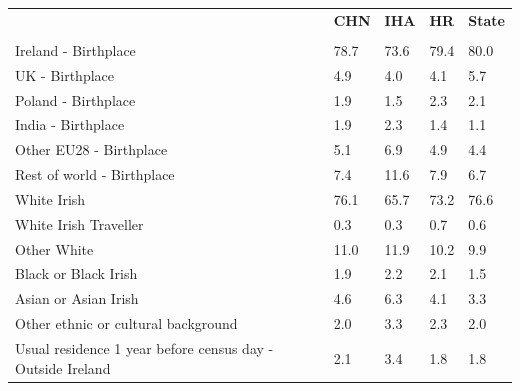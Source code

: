 \documentclass{article}
\begin{document}
\pagebreak
\begin{table}[h]	
\centering
		\begin{tabular}{KTTTT}
  \hline
& \textbf{CHN} & \textbf{IHA} & \textbf{HR}& \textbf{State}\\ 
  \hline
    \\ 
    \hline
Ireland - Birthplace & 78.7& 73.6& 79.4& 80.0\\
UK - Birthplace & 4.9& 4.0& 4.1& 5.7\\
Poland - Birthplace & 1.9& 1.5& 2.3& 2.1\\
India - Birthplace & 1.9& 2.3& 1.4& 1.1\\
Other EU28 - Birthplace & 5.1& 6.9& 4.9& 4.4\\
Rest of world - Birthplace &  7.4& 11.6&  7.9&  6.7\\
    \hline
White Irish & 76.1& 65.7& 73.2& 76.6\\
White Irish Traveller & 0.3& 0.3& 0.7& 0.6\\
Other White & 11.0& 11.9& 10.2&  9.9\\
Black or Black Irish & 1.9& 2.2& 2.1& 1.5\\
Asian or Asian Irish & 4.6& 6.3& 4.1& 3.3\\
Other ethnic or cultural background & 2.0& 3.3& 2.3& 2.0\\
    \hline
Usual residence 1 year before census day - Outside Ireland & 2.1& 3.4& 1.8& 1.8\\


\end{tabular}
\end{table}
\end{document}
